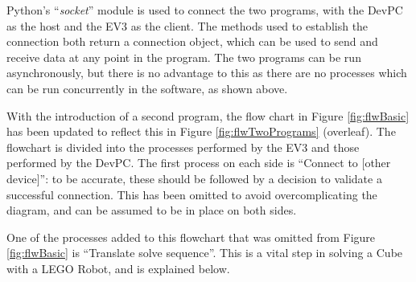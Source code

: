 \documentclass{report}
\newcommand{\tit}[1]{\textit{#1}}
\newcommand{\propernoun}[1]{\enquote{\tit{#1}}}
\newcommand{\lego}{LEGO }
\begin{document}
    Python's \propernoun{socket} module is used to connect the two programs, with the DevPC as the host and the EV3 as the client. The methods used to establish the connection both return a connection object, which can be used to send and receive data at any point in the program. The two programs can be run asynchronously, but there is no advantage to this as there are no processes which can be run concurrently in the software, as shown above.
    
    With the introduction of a second program, the flow chart in Figure \ref{fig:flwBasic} has been updated to reflect this in Figure \ref{fig:flwTwoPrograms} (overleaf). The flowchart is divided into the processes performed by the EV3 and those performed by the DevPC. The first process on each side is \enquote{Connect to [other device]}: to be accurate, these should be followed by a decision to validate a successful connection. This has been omitted to avoid overcomplicating the diagram, and can be assumed to be in place on both sides.
    
    One of the processes added to this flowchart that was omitted from Figure \ref{fig:flwBasic} is \enquote{Translate solve sequence}. This is a vital step in solving a Cube with a \lego Robot, and is explained below.
    
\end{document}
